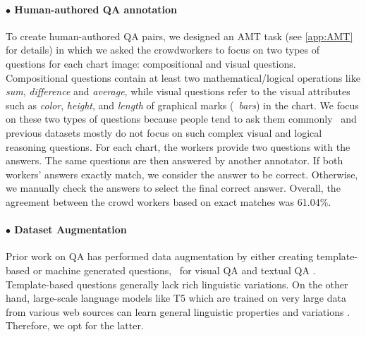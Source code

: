 \paragraph{$\bullet$ Human-authored QA annotation} To create human-authored QA pairs, we designed an AMT task (see \ref{app:AMT} for details) in which we asked the crowdworkers to focus on two types of questions for each chart image: compositional and visual questions. Compositional questions contain at least two mathematical/logical operations like \emph{sum}, \emph{difference} and \emph{average}, while visual questions refer to the visual attributes such as \textit{color}, \textit{height}, and \textit{length} of graphical marks (\eg\ \textit{bars}) in the chart. We focus on these two types of questions because people tend to ask them commonly~\cite{kim2020answering, hoque-etal-2017} and previous datasets mostly do not focus on such complex visual and logical reasoning questions. 
For each chart, the workers provide two questions with the answers. The same questions are then answered
by another annotator. If both workers' answers exactly match, we consider the answer to be correct. Otherwise, we manually check the answers to select the final correct answer. 
Overall, the agreement between the crowd workers based on exact matches was 61.04\%. 

\paragraph{$\bullet$ Dataset Augmentation}

Prior work on QA  has performed data augmentation by either creating template-based  or machine generated questions, \eg\ for visual QA \cite{visual-data-augmentation}  and textual QA \cite{paq}. Template-based questions generally lack rich linguistic variations. On the other hand, large-scale language models like T5 \cite{Raffel2020t5} which are trained on very large data from various web sources can learn general linguistic properties and variations \cite{NEURIPS2020_1457c0d6}. Therefore, we opt for the latter.

